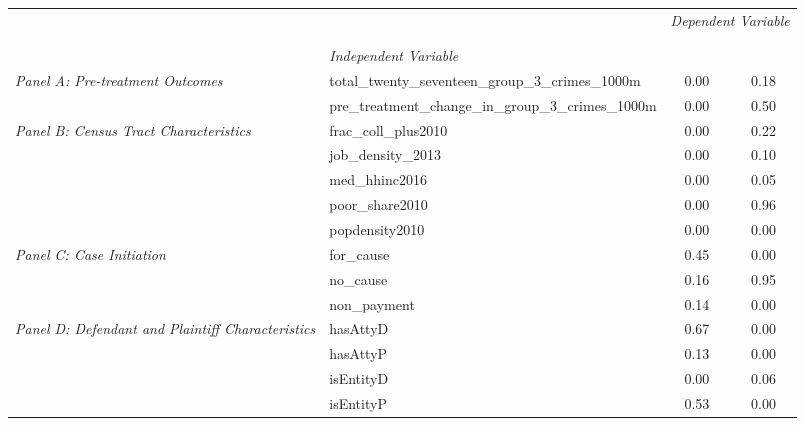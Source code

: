 \begin{tabular}{llcc}
\toprule
 &  & \multicolumn{2}{c}{\textit{Dependent Variable}} \\
\cline{3-4}
\\
 &  &  &  \\
 & \emph{Independent Variable} &  &  \\
\midrule
\multirow[c]{2}{3cm}{\textit{Panel A: Pre-treatment Outcomes}} & total_twenty_seventeen_group_3_crimes_1000m & 0.00 & 0.18 \\
 & pre_treatment_change_in_group_3_crimes_1000m & 0.00 & 0.50 \\
\cline{1-4}
\multirow[c]{5}{3cm}{\textit{Panel B: Census Tract Characteristics}} & frac_coll_plus2010 & 0.00 & 0.22 \\
 & job_density_2013 & 0.00 & 0.10 \\
 & med_hhinc2016 & 0.00 & 0.05 \\
 & poor_share2010 & 0.00 & 0.96 \\
 & popdensity2010 & 0.00 & 0.00 \\
\cline{1-4}
\multirow[c]{3}{3cm}{\textit{Panel C: Case Initiation}} & for_cause & 0.45 & 0.00 \\
 & no_cause & 0.16 & 0.95 \\
 & non_payment & 0.14 & 0.00 \\
\cline{1-4}
\multirow[c]{4}{3cm}{\textit{Panel D: Defendant and Plaintiff Characteristics}} & hasAttyD & 0.67 & 0.00 \\
 & hasAttyP & 0.13 & 0.00 \\
 & isEntityD & 0.00 & 0.06 \\
 & isEntityP & 0.53 & 0.00 \\
\cline{1-4}
\bottomrule
\end{tabular}
